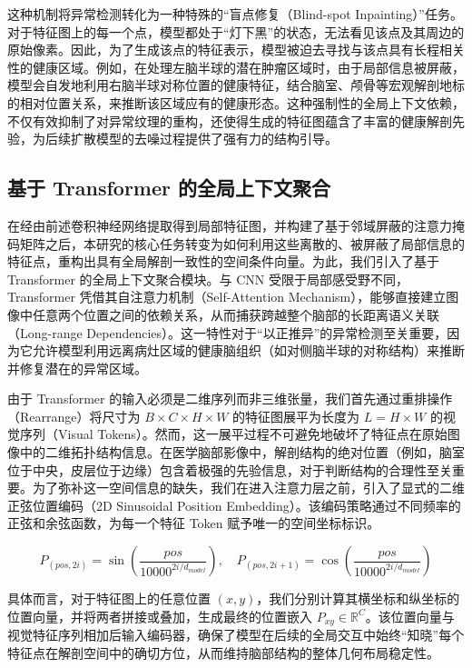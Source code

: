 \documentclass[Win]{xjtuBSThesis}  %
\begin{document}
这种机制将异常检测转化为一种特殊的“盲点修复（Blind-spot Inpainting）”任务。对于特征图上的每一个点，模型都处于“灯下黑”的状态，无法看见该点及其周边的原始像素。因此，为了生成该点的特征表示，模型被迫去寻找与该点具有长程相关性的健康区域。例如，在处理左脑半球的潜在肿瘤区域时，由于局部信息被屏蔽，模型会自发地利用右脑半球对称位置的健康特征，结合脑室、颅骨等宏观解剖地标的相对位置关系，来推断该区域应有的健康形态。这种强制性的全局上下文依赖，不仅有效抑制了对异常纹理的重构，还使得生成的特征图蕴含了丰富的健康解剖先验，为后续扩散模型的去噪过程提供了强有力的结构引导。



\subsection{基于 Transformer 的全局上下文聚合}
\label{subsec:transformer_agg}

在经由前述卷积神经网络提取得到局部特征图，并构建了基于邻域屏蔽的注意力掩码矩阵之后，本研究的核心任务转变为如何利用这些离散的、被屏蔽了局部信息的特征点，重构出具有全局解剖一致性的空间条件向量。为此，我们引入了基于 Transformer 的全局上下文聚合模块。与 CNN 受限于局部感受野不同，Transformer 凭借其自注意力机制（Self-Attention Mechanism），能够直接建立图像中任意两个位置之间的依赖关系，从而捕获跨越整个脑部的长距离语义关联（Long-range Dependencies）。这一特性对于“以正推异”的异常检测至关重要，因为它允许模型利用远离病灶区域的健康脑组织（如对侧脑半球的对称结构）来推断并修复潜在的异常区域。

由于 Transformer 的输入必须是二维序列而非三维张量，我们首先通过重排操作（Rearrange）将尺寸为 $B \times C \times H \times W$ 的特征图展平为长度为 $L = H \times W$ 的视觉序列（Visual Tokens）。然而，这一展平过程不可避免地破坏了特征点在原始图像中的二维拓扑结构信息。在医学脑部影像中，解剖结构的绝对位置（例如，脑室位于中央，皮层位于边缘）包含着极强的先验信息，对于判断结构的合理性至关重要。为了弥补这一空间信息的缺失，我们在进入注意力层之前，引入了显式的二维正弦位置编码（2D Sinusoidal Position Embedding）。该编码策略通过不同频率的正弦和余弦函数，为每一个特征 Token 赋予唯一的空间坐标标识。

\begin{equation}
    P_{(pos, 2i)} = \sin\left(\frac{pos}{10000^{2i/d_{model}}}\right), \quad P_{(pos, 2i+1)} = \cos\left(\frac{pos}{10000^{2i/d_{model}}}\right)
\end{equation}

具体而言，对于特征图上的任意位置 $(x, y)$，我们分别计算其横坐标和纵坐标的位置向量，并将两者拼接或叠加，生成最终的位置嵌入 $P_{xy} \in \mathbb{R}^C$。该位置向量与视觉特征序列相加后输入编码器，确保了模型在后续的全局交互中始终“知晓”每个特征点在解剖空间中的确切方位，从而维持脑部结构的整体几何布局稳定性。
\end{document}
